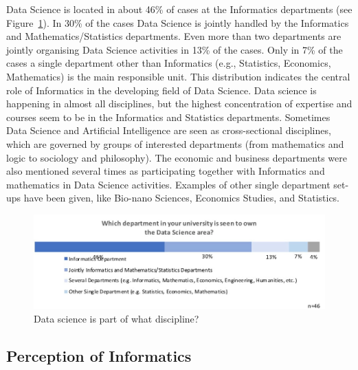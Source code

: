 Data Science is located in about 46\% of cases at the Informatics departments (see Figure~\ref{sect4:discipline}). In 30\% of the cases Data Science is jointly handled by the Informatics and Mathematics/Statistics departments. Even more than two departments are jointly organising Data Science activities in 13\% of the cases. Only in 7\% of the cases a single department other than Informatics (e.g., Statistics, Economics, Mathematics) is the main responsible unit. This distribution indicates the central role of Informatics in the developing field of Data Science. Data science is happening in almost all disciplines, but the highest concentration of expertise and courses seem to be in the Informatics and Statistics departments. Sometimes Data Science and Artificial Intelligence are seen as cross-sectional disciplines, which are governed by groups of interested departments (from mathematics and logic to sociology and philosophy). The economic and business departments were also mentioned several times as participating together with Informatics and mathematics in Data Science activities. Examples of other single department set-ups have been given, like Bio-nano Sciences, Economics Studies, and Statistics.

\begin{figure}[h]
\centering
\includegraphics[width = \linewidth]{charts/4a.jpg}
\caption{Data science is part of what discipline?}
\label{sect4:discipline}
\end{figure}

\subsection{Perception of Informatics}

